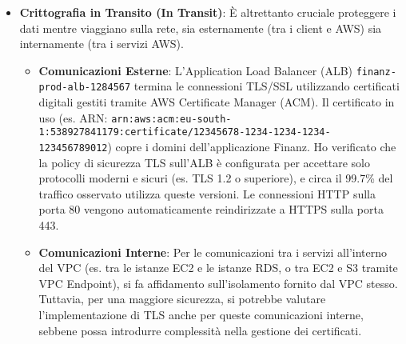 \begin{itemize}
    \item \textbf{Crittografia in Transito (In Transit)}: È altrettanto cruciale proteggere i dati mentre viaggiano sulla rete, sia esternamente (tra i client e AWS) sia internamente (tra i servizi AWS).
        \begin{itemize}
            \item \textbf{Comunicazioni Esterne}: L'Application Load Balancer (ALB) \texttt{finanz-prod-alb-1284567} termina le connessioni TLS/SSL utilizzando certificati digitali gestiti tramite AWS Certificate Manager (ACM). Il certificato in uso (es. ARN: \texttt{arn:aws:acm:eu-south-1:538927841179:certificate/12345678-1234-1234-1234-123456789012}) copre i domini dell'applicazione Finanz. Ho verificato che la policy di sicurezza TLS sull'ALB è configurata per accettare solo protocolli moderni e sicuri (es. TLS 1.2 o superiore), e circa il 99.7\% del traffico osservato utilizza queste versioni. Le connessioni HTTP sulla porta 80 vengono automaticamente reindirizzate a HTTPS sulla porta 443.
            \item \textbf{Comunicazioni Interne}: Per le comunicazioni tra i servizi all'interno del VPC (es. tra le istanze EC2 e le istanze RDS, o tra EC2 e S3 tramite VPC Endpoint), si fa affidamento sull'isolamento fornito dal VPC stesso. Tuttavia, per una maggiore sicurezza, si potrebbe valutare l'implementazione di TLS anche per queste comunicazioni interne, sebbene possa introdurre complessità nella gestione dei certificati.
        \end{itemize}
\end{itemize}

